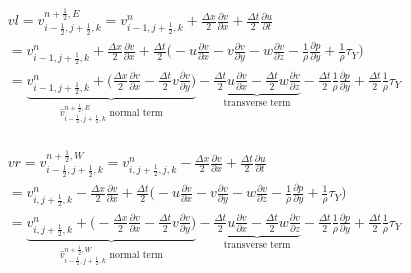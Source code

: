\documentclass{article}
\numberwithin{equation}{subsection}
\begin{document}
\begin{align}
\begin{split}
& vl = v_{i-\frac{1}{2},j+\frac{1}{2},k}^{n+\frac{1}{2},E} = v_{i-1,j+\frac{1}{2},k}^n + \frac{\Delta x}{2}\frac{\partial v}{\partial x} + \frac{\Delta t}{2}\frac{\partial u}{\partial t}\\
&= v_{i-1,j+\frac{1}{2},k}^n + \frac{\Delta x}{2} \frac{\partial v}{\partial x} + \frac{\Delta t}{2} \Big( -u\frac{\partial v}{\partial x} -v\frac{\partial v}{\partial y} -w\frac{\partial v}{\partial z} - \frac{1}{\rho}\frac{\partial p}{\partial y} +\frac{1}{\rho}\tau_Y\Big) \\
&= \underbrace{v_{i-1,j+\frac{1}{2},k}^n + \Big(\frac{\Delta x}{2}\frac{\partial v}{\partial x} - \frac{\Delta t}{2} v\frac{\partial v}{\partial y}\Big)}_\text{$\widehat{v}_{i-\frac{1}{2},j+\frac{1}{2},k}^{n+\frac{1}{2},E}$ normal term} -\underbrace{\frac{\Delta t}{2}u\frac{\partial v}{\partial x} - \frac{\Delta t}{2}w\frac{\partial v}{\partial z}}_\text{transverse term} - \frac{\Delta t}{2}\frac{1}{\rho}\frac{\partial p}{\partial y} + \frac{\Delta t}{2}\frac{1}{\rho}\tau_Y
\end{split}
\end{align}

\begin{align}
\begin{split}
& vr = v_{i-\frac{1}{2},j+\frac{1}{2},k}^{n+\frac{1}{2},W} = v_{i,j+\frac{1}{2},j,k}^n - \frac{\Delta x}{2}\frac{\partial v}{\partial x} + \frac{\Delta t}{2}\frac{\partial u}{\partial t}\\
&= v_{i,j+\frac{1}{2},k}^n - \frac{\Delta x}{2} \frac{\partial v}{\partial x} + \frac{\Delta t}{2} \Big( -u\frac{\partial v}{\partial x} -v\frac{\partial v}{\partial y} -w\frac{\partial v}{\partial z} - \frac{1}{\rho}\frac{\partial p}{\partial y} +\frac{1}{\rho}\tau_Y\Big) \\
&= \underbrace{v_{i,j+\frac{1}{2},k}^n + \Big(-\frac{\Delta x}{2}\frac{\partial v}{\partial x} - \frac{\Delta t}{2} v\frac{\partial v}{\partial y}\Big)}_\text{$\widehat{v}_{i-\frac{1}{2},j+\frac{1}{2},k}^{n+\frac{1}{2},W}$ normal term} -\underbrace{\frac{\Delta t}{2}u\frac{\partial v}{\partial x} - \frac{\Delta t}{2}w\frac{\partial v}{\partial z}}_\text{transverse term} - \frac{\Delta t}{2}\frac{1}{\rho}\frac{\partial p}{\partial y} + \frac{\Delta t}{2}\frac{1}{\rho}\tau_Y
\end{split}
\end{align}
\end{document}
